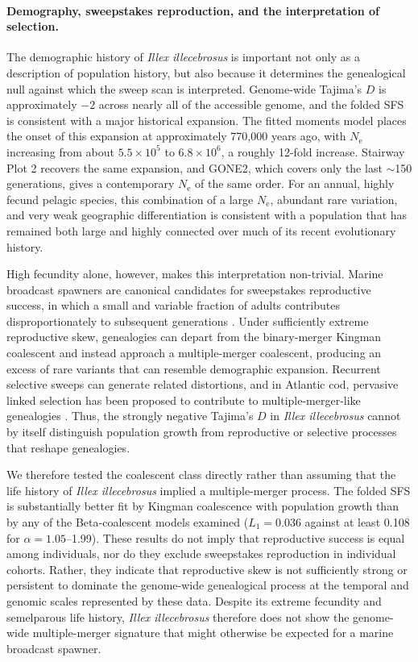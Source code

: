 \documentclass[11pt]{article}
\newcommand{\illex}{\textit{Illex illecebrosus}}
\newcommand{\Ne}{N_\mathrm{e}}
\begin{document}
\paragraph{Demography, sweepstakes reproduction, and the interpretation of selection.}
The demographic history of \illex{} is important not only as a description of population history, but also because it determines the genealogical null against which the sweep scan is interpreted. Genome-wide Tajima's $D$ is approximately $-2$ across nearly all of the accessible genome, and the folded SFS is consistent with a major historical expansion. The fitted moments model places the onset of this expansion at approximately 770{,}000 years ago, with $\Ne$ increasing from about $5.5\times10^5$ to $6.8\times10^6$, a roughly 12-fold increase. Stairway Plot 2 recovers the same expansion, and GONE2, which covers only the last $\sim$150 generations, gives a contemporary $\Ne$ of the same order. For an annual, highly fecund pelagic species, this combination of a large $\Ne$, abundant rare variation, and very weak geographic differentiation is consistent with a population that has remained both large and highly connected over much of its recent evolutionary history.

High fecundity alone, however, makes this interpretation non-trivial. Marine broadcast spawners are canonical candidates for sweepstakes reproductive success, in which a small and variable fraction of adults contributes disproportionately to subsequent generations \citep{eldon2006,hedgecock2011}. Under sufficiently extreme reproductive skew, genealogies can depart from the binary-merger Kingman coalescent and instead approach a multiple-merger coalescent, producing an excess of rare variants that can resemble demographic expansion. Recurrent selective sweeps can generate related distortions, and in Atlantic cod, pervasive linked selection has been proposed to contribute to multiple-merger-like genealogies \citep{arnason2023}. Thus, the strongly negative Tajima's $D$ in \illex{} cannot by itself distinguish population growth from reproductive or selective processes that reshape genealogies.

We therefore tested the coalescent class directly rather than assuming that the life history of \illex{} implied a multiple-merger process. The folded SFS is substantially better fit by Kingman coalescence with population growth than by any of the Beta-coalescent models examined ($L_1=0.036$ against at least 0.108 for $\alpha=1.05$--1.99). These results do not imply that reproductive success is equal among individuals, nor do they exclude sweepstakes reproduction in individual cohorts. Rather, they indicate that reproductive skew is not sufficiently strong or persistent to dominate the genome-wide genealogical process at the temporal and genomic scales represented by these data. Despite its extreme fecundity and semelparous life history, \illex{} therefore does not show the genome-wide multiple-merger signature that might otherwise be expected for a marine broadcast spawner.
\end{document}

